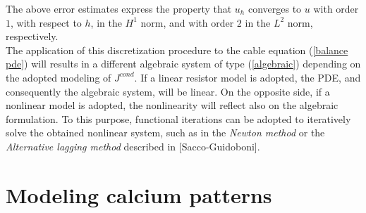 \documentclass[12pt, a4paper]{article}
\begin{document}
The above error estimates express the property that $u_h$ converges to $u$ with order $1$, with respect to $h$, in the $H^1$ norm, and with order $2$ in the $L^2$ norm, respectively.\\
The application of this discretization procedure to the cable equation (\ref{balance pde}) will results in a different algebraic system of type (\ref{algebraic}) depending on the adopted modeling of  $J^{cond}$. If a linear resistor model is adopted, the PDE, and consequently the algebraic system, will be linear. On the opposite side, if a nonlinear model is adopted, the nonlinearity will reflect also on the algebraic formulation. To this purpose, functional iterations can be adopted to iteratively solve the obtained nonlinear system, such as in the \textit{Newton method} or the \textit{Alternative lagging method} described in [Sacco-Guidoboni].

\newpage

\section{Modeling calcium patterns}
\end{document}
